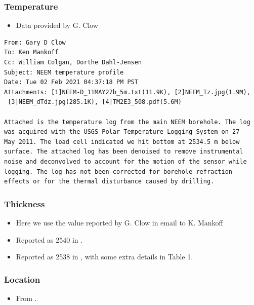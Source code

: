 \documentclass[article,a4paper,times,11pt,twoside]{article}
\begin{document}
\subsubsection{Temperature}
\label{sec:orgaea9a28}

\begin{itemize}
\item Data provided by G. Clow
\end{itemize}

\begin{verbatim}
From: Gary D Clow
To: Ken Mankoff
Cc: William Colgan, Dorthe Dahl-Jensen
Subject: NEEM temperature profile
Date: Tue 02 Feb 2021 04:37:18 PM PST
Attachments: [1]NEEM-D_11MAY27b_5m.txt(11.9K), [2]NEEM_Tz.jpg(1.9M),
 [3]NEEM_dTdz.jpg(285.1K), [4]TM2E3_508.pdf(5.6M)

Attached is the temperature log from the main NEEM borehole. The log
was acquired with the USGS Polar Temperature Logging System on 27
May 2011. The load cell indicated we hit bottom at 2534.5 m below
surface. The attached log has been denoised to remove instrumental
noise and deconvolved to account for the motion of the sensor while
logging. The log has not been corrected for borehole refraction
effects or for the thermal disturbance caused by drilling.
\end{verbatim}

\subsubsection{Thickness}
\label{sec:org515b0a0}

\begin{itemize}
\item Here we use the value reported by G. Clow in email to K. Mankoff
\item Reported as 2540 in \textcite{dahl-jensen_2013}.
\item Reported as 2538 in \textcite{macgregor_2016}, with some extra details in Table 1.
\end{itemize}

\subsubsection{Location}
\label{sec:orgda92b80}

\begin{itemize}
\item From \textcite{dahl-jensen_2013}.
\end{itemize}
\end{document}
